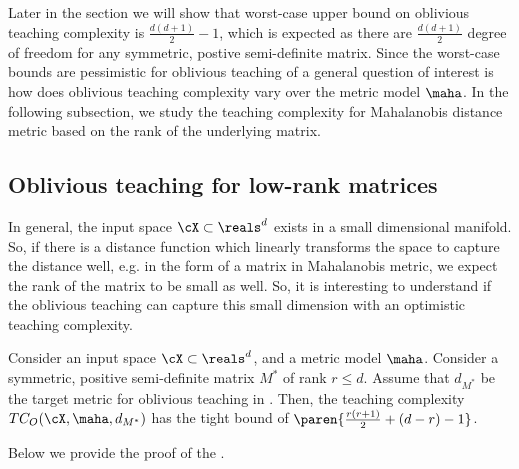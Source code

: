Later in the section we will show that worst-case upper bound on oblivious teaching complexity is $\frac{d(d+1)}{2} - 1$, which is expected as there are $\frac{d(d+1)}{2}$ degree of freedom for any symmetric, postive semi-definite matrix. Since the worst-case bounds are pessimistic for oblivious teaching of  a general question of interest is how does oblivious teaching complexity vary over the metric model $\maha$. In the following subsection, we study the teaching complexity for Mahalanobis distance metric based on the rank of the underlying matrix. 

\subsection{Oblivious teaching for low-rank matrices}
In general, the input space $\cX \subset \reals^d$ exists in a small dimensional manifold. So, if there is a distance function which linearly transforms the space to capture the distance well, e.g. in the form of a matrix in Mahalanobis metric, we expect the rank of the matrix to be small as well.
So, it is interesting to understand if the oblivious teaching can capture this small dimension with an optimistic teaching complexity. 


\begin{theorem}\label{thm: obv}
    Consider an input space $\cX \subset \reals^d$, and a metric model $\maha$.
    Consider a symmetric, positive semi-definite matrix $M^*$ of rank $r \le d$. Assume that $d_{M^*}$ be the target metric for oblivious teaching in . Then, the teaching complexity $TC_O(\cX, \maha, d_{M^*})$ has the tight bound of $\paren{\frac{r(r+1)}{2} + (d - r) - 1}$.
\end{theorem}

Below we provide the proof of the . 

